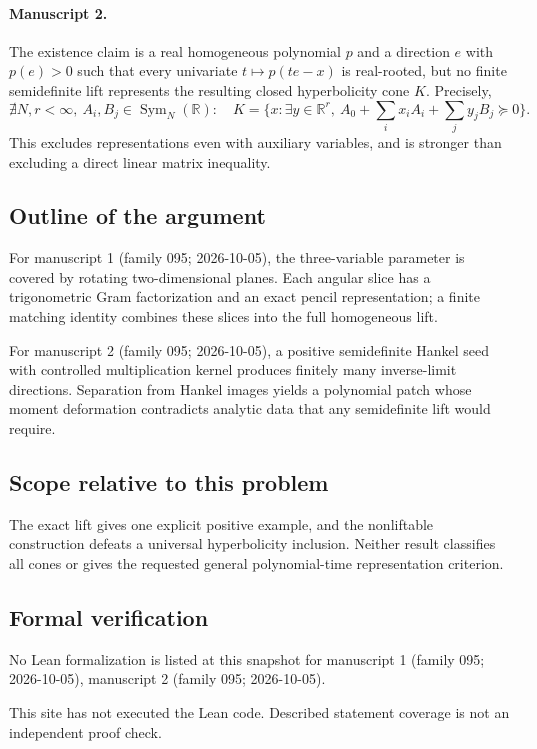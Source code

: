 \documentclass[11pt]{article}
\begin{document}
\paragraph{Manuscript 2.}
The existence claim is a real homogeneous polynomial $p$ and a direction $e$ with $p(e)>0$ such that every univariate $t\mapsto p(te-x)$ is real-rooted, but no finite semidefinite lift represents the resulting closed hyperbolicity cone $K$. Precisely,
\[
 \nexists N,r<\infty,\ A_i,B_j\in\operatorname{Sym}_N(\mathbb R):\quad
 K=\{x:\exists y\in\mathbb R^r,\ A_0+\sum_ix_iA_i+\sum_jy_jB_j\succeq0\}.
\]
This excludes representations even with auxiliary variables, and is stronger than excluding a direct linear matrix inequality.

\subsection{Outline of the argument}
For manuscript 1 (family 095; 2026-10-05), the three-variable parameter is covered by rotating two-dimensional planes. Each angular slice has a trigonometric Gram factorization and an exact pencil representation; a finite matching identity combines these slices into the full homogeneous lift.

For manuscript 2 (family 095; 2026-10-05), a positive semidefinite Hankel seed with controlled multiplication kernel produces finitely many inverse-limit directions. Separation from Hankel images yields a polynomial patch whose moment deformation contradicts analytic data that any semidefinite lift would require.

\subsection{Scope relative to this problem}
The exact lift gives one explicit positive example, and the nonliftable construction defeats a universal hyperbolicity inclusion. Neither result classifies all cones or gives the requested general polynomial-time representation criterion.

\subsection{Formal verification}
No Lean formalization is listed at this snapshot for manuscript 1 (family 095; 2026-10-05), manuscript 2 (family 095; 2026-10-05).

This site has not executed the Lean code. Described statement coverage is not an independent proof check.
\end{document}
